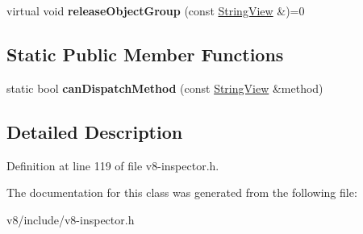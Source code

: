 \begin{DoxyCompactItemize}
\item 
\mbox{\label{classv8__inspector_1_1V8InspectorSession_a3a7e04f754c93086d7e61ad483bd38aa}} 
virtual void {\bfseries release\+Object\+Group} (const \mbox{\hyperlink{classv8__inspector_1_1StringView}{String\+View}} \&)=0
\end{DoxyCompactItemize}
\subsection*{Static Public Member Functions}
\begin{DoxyCompactItemize}
\item 
\mbox{\label{classv8__inspector_1_1V8InspectorSession_a34718345c6d8f43eb07222af2fd8c232}} 
static bool {\bfseries can\+Dispatch\+Method} (const \mbox{\hyperlink{classv8__inspector_1_1StringView}{String\+View}} \&method)
\end{DoxyCompactItemize}


\subsection{Detailed Description}


Definition at line 119 of file v8-\/inspector.\+h.



The documentation for this class was generated from the following file\+:\begin{DoxyCompactItemize}
\item 
v8/include/v8-\/inspector.\+h\end{DoxyCompactItemize}
